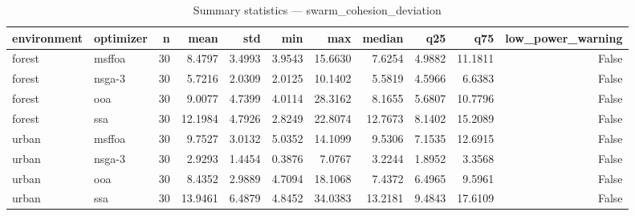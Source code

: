 \begin{table}
\caption{Summary statistics — swarm_cohesion_deviation}
\label{tab:summary-swarm_cohesion_deviation}
\begin{tabular}{llrrrrrrrrr}
\toprule
environment & optimizer & n & mean & std & min & max & median & q25 & q75 & low\_power\_warning \\
\midrule
forest & msffoa & 30 & 8.4797 & 3.4993 & 3.9543 & 15.6630 & 7.6254 & 4.9882 & 11.1811 & False \\
forest & nsga-3 & 30 & 5.7216 & 2.0309 & 2.0125 & 10.1402 & 5.5819 & 4.5966 & 6.6383 & False \\
forest & ooa & 30 & 9.0077 & 4.7399 & 4.0114 & 28.3162 & 8.1655 & 5.6807 & 10.7796 & False \\
forest & ssa & 30 & 12.1984 & 4.7926 & 2.8249 & 22.8074 & 12.7673 & 8.1402 & 15.2089 & False \\
urban & msffoa & 30 & 9.7527 & 3.0132 & 5.0352 & 14.1099 & 9.5306 & 7.1535 & 12.6915 & False \\
urban & nsga-3 & 30 & 2.9293 & 1.4454 & 0.3876 & 7.0767 & 3.2244 & 1.8952 & 3.3568 & False \\
urban & ooa & 30 & 8.4352 & 2.9889 & 4.7094 & 18.1068 & 7.4372 & 6.4965 & 9.5961 & False \\
urban & ssa & 30 & 13.9461 & 6.4879 & 4.8452 & 34.0383 & 13.2181 & 9.4843 & 17.6109 & False \\
\bottomrule
\end{tabular}
\end{table}
